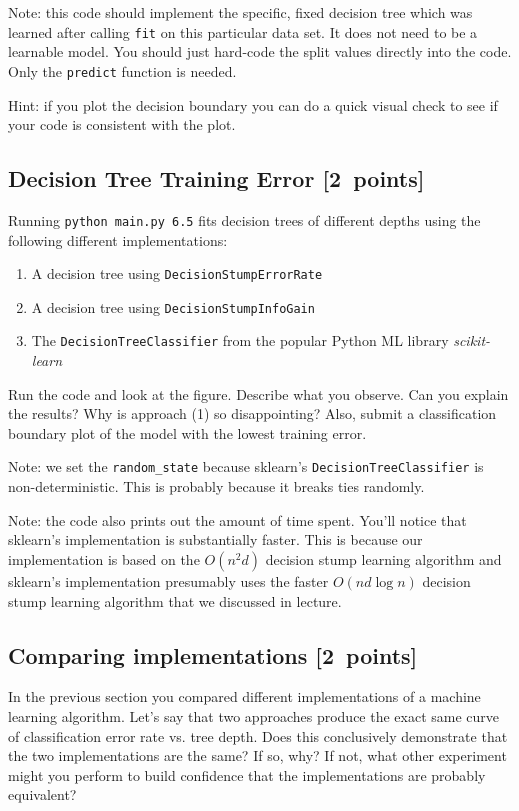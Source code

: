 \documentclass{article}
\newcommand{\blu}[1]{{\textcolor{blu}{#1}}}
\let\ask\blu
\newcommand\pts[1]{\textcolor{pointscolour}{[#1~points]}}
\begin{document}
  Note: this code should implement the specific, fixed decision tree
  which was learned after calling \texttt{fit} on this particular data set. It does not need to be a learnable model.
  You should just hard-code the split values directly into the code.
  Only the \texttt{predict} function is needed.

  Hint: if you plot the decision boundary you can do a quick visual check to see if your code is consistent with the plot.

  



  \subsection{Decision Tree Training Error \pts{2}}

  Running \texttt{python main.py 6.5} fits decision trees of different depths using the following different implementations:
  \begin{enumerate}
  \item A decision tree using \texttt{DecisionStumpErrorRate}
  \item A decision tree using \texttt{DecisionStumpInfoGain}
  \item The \texttt{DecisionTreeClassifier} from the popular Python ML library \emph{scikit-learn}
  \end{enumerate}

  Run the code and look at the figure.
  \ask{Describe what you observe. Can you explain the results?} Why is approach (1) so disappointing? Also, \ask{submit a classification boundary plot of the model with the lowest training error}.

  Note: we set the \verb|random_state| because sklearn's \texttt{DecisionTreeClassifier} is non-deterministic. This is probably
  because it breaks ties randomly.

  Note: the code also prints out the amount of time spent. You'll notice that sklearn's implementation is substantially faster. This is because
  our implementation is based on the $O(n^2d)$ decision stump learning algorithm and sklearn's implementation presumably uses the faster $O(nd\log n)$
  decision stump learning algorithm that we discussed in lecture.


  \subsection{Comparing implementations \pts{2}}

  In the previous section you compared different implementations of a machine learning algorithm. Let's say that two
  approaches produce the exact same curve of classification error rate vs. tree depth. Does this conclusively demonstrate
  that the two implementations are the same? If so, why? If not, what other experiment might you perform to build confidence
  that the implementations are probably equivalent?

\end{document}
